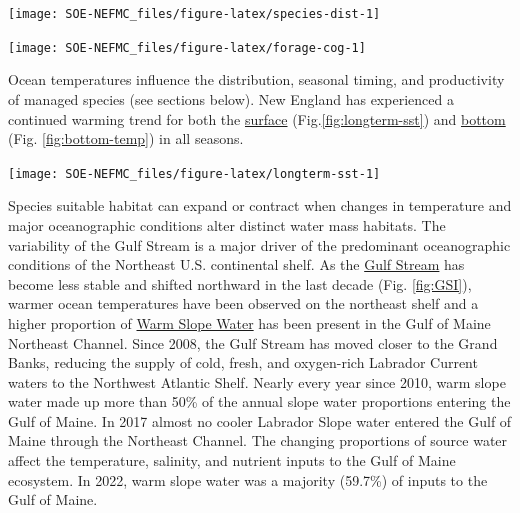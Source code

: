 \documentclass[
  10pt,
]{article}
\let\origfigure\figure
\let\endorigfigure\endfigure
\renewenvironment{figure}[1][2] {
    \expandafter\origfigure\expandafter[H]
} {
    \endorigfigure
}
\begin{document}
\begin{figure}

{\centering \texttt{[image: SOE-NEFMC\_files/figure-latex/species-dist-1]} 

}

\caption{Aggregate species distribution metrics for species in the Northeast Large Marine Ecosystem.}\label{fig:species-dist}
\end{figure}
\begin{figure}

{\centering \texttt{[image: SOE-NEFMC\_files/figure-latex/forage-cog-1]} 

}

\caption{Eastward (left) and northward (right) shifts in the center of gravity for 20 forage fish species on the Northeast U.S. Shelf.}\label{fig:forage-cog}
\end{figure}

Ocean temperatures influence the distribution, seasonal timing, and productivity of managed species (see sections below). New England has experienced a continued warming trend for both the \href{https://noaa-edab.github.io/catalog/sea-surface-temperature-anomaly.html}{surface} (Fig.\ref{fig:longterm-sst}) and \href{https://noaa-edab.github.io/catalog/bottom-temperature---seasonal-anomaly.html}{bottom} (Fig. \ref{fig:bottom-temp}) in all seasons.

\begin{figure}

{\centering \texttt{[image: SOE-NEFMC\_files/figure-latex/longterm-sst-1]} 

}

\caption{Mean sea surface temperature across the entire Mid-Atlantic shelf.}\label{fig:longterm-sst}
\end{figure}

Species suitable habitat can expand or contract when changes in temperature and major oceanographic conditions alter distinct water mass habitats. The variability of the Gulf Stream is a major driver of the predominant oceanographic conditions of the Northeast U.S. continental shelf. As the \href{https://noaa-edab.github.io/catalog/gulf-stream-index.html}{Gulf Stream} has become less stable and shifted northward in the last decade (Fig. \ref{fig:GSI}), warmer ocean temperatures have been observed on the northeast shelf and a higher proportion of \href{https://noaa-edab.github.io/catalog/slopewater-proportions.html}{Warm Slope Water} has been present in the Gulf of Maine Northeast Channel. Since 2008, the Gulf Stream has moved closer to the Grand Banks, reducing the supply of cold, fresh, and oxygen-rich Labrador Current waters to the Northwest Atlantic Shelf. Nearly every year since 2010, warm slope water made up more than 50\% of the annual slope water proportions entering the Gulf of Maine. In 2017 almost no cooler Labrador Slope water entered the Gulf of Maine through the Northeast Channel. The changing proportions of source water affect the temperature, salinity, and nutrient inputs to the Gulf of Maine ecosystem. In 2022, warm slope water was a majority (59.7\%) of inputs to the Gulf of Maine.
\end{document}
